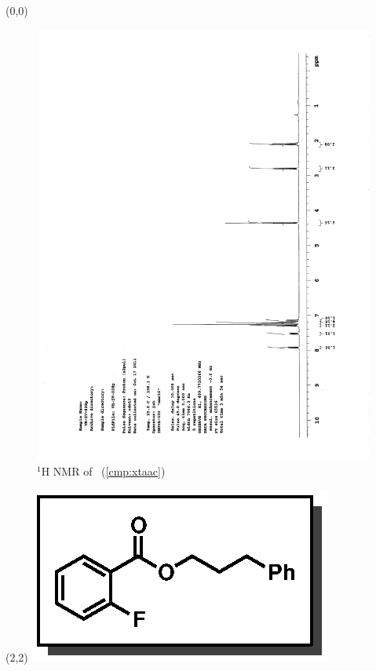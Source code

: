 \begin{textblock}{20}(0,0)
\begin{figure}[htb]
\caption{$^1$H NMR of \CMPxtaac\ (\ref{cmp:xtaac})}
\includegraphics[scale=0.75, trim = 0mm 0mm 0mm 5mm,
clip]{chp_asymmetric/images/nmr/xtaacH}
\vspace{-100pt}
\end{figure}
\end{textblock}
\begin{textblock}{1}(2,2)
\includegraphics[scale=0.8, angle=90]{chp_asymmetric/images/xtaac}
\end{textblock}

